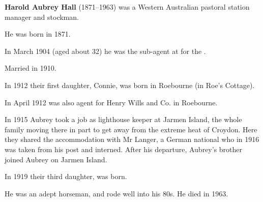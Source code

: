 
\textbf{Harold Aubrey Hall} (1871--1963) was a Western Australian pastoral station manager and stockman.

He was born in 1871.\cite{ADBWSHall}

In March 1904 (aged about 32) he was the sub-agent at  for the .\cite{1904AubreyAgent}

Married  in 1910.\cite{HAHmarriage}

In 1912 their first daughter, Connie, was born in Roebourne (in Roe's Cottage).\cite{Connie1966}

In April 1912 was also agent for Henry Wills and Co. in Roebourne.\cite{NorthernTimes1912}

In 1915 Aubrey took a job as lighthouse keeper at Jarmen Island,
the whole family moving there in part to get away from the extreme heat of Croydon.\cite{Connie1983}
Here they shared the accommodation with Mr Langer,
a German national who in 1916 was taken from his post and interned.\cite{Connie1983}
After his departure, Aubrey's brother  joined Aubrey on Jarmen Island.

In 1919 their third daughter,  was born.

He was an adept horseman, and rode well into his 80s. He died in 1963.
